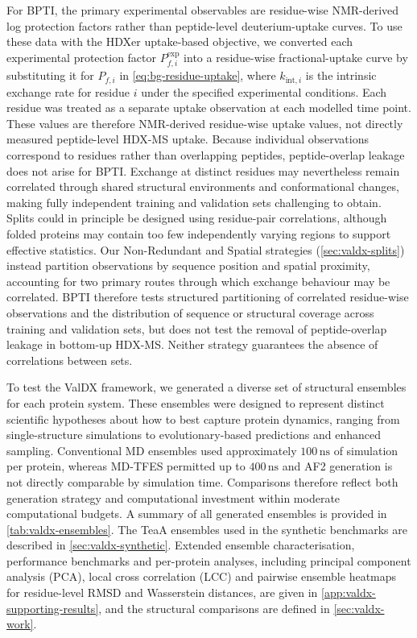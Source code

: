 For BPTI, the primary experimental observables are residue-wise NMR-derived log protection factors rather than peptide-level deuterium-uptake curves.\supercite{leeInterpretingHydrogenDeuteriumExchange2021} To use these data with the HDXer uptake-based objective, we converted each experimental protection factor $P_{f,i}^\text{exp}$ into a residue-wise fractional-uptake curve by substituting it for $P_{f,i}$ in \cref{eq:bg-residue-uptake}, where $k_{\text{int},i}$ is the intrinsic exchange rate for residue $i$ under the specified experimental conditions. Each residue was treated as a separate uptake observation at each modelled time point. These values are therefore NMR-derived residue-wise uptake values, not directly measured peptide-level HDX-MS uptake. Because individual observations correspond to residues rather than overlapping peptides, peptide-overlap leakage does not arise for BPTI. Exchange at distinct residues may nevertheless remain correlated through shared structural environments and conformational changes, making fully independent training and validation sets challenging to obtain. Splits could in principle be designed using residue-pair correlations, although folded proteins may contain too few independently varying regions to support effective statistics. Our Non-Redundant and Spatial strategies (\cref{sec:valdx-splits}) instead partition observations by sequence position and spatial proximity, accounting for two primary routes through which exchange behaviour may be correlated. BPTI therefore tests structured partitioning of correlated residue-wise observations and the distribution of sequence or structural coverage across training and validation sets, but does not test the removal of peptide-overlap leakage in bottom-up HDX-MS. Neither strategy guarantees the absence of correlations between sets.

To test the ValDX framework, we generated a diverse set of structural ensembles for each protein system. These ensembles were designed to represent distinct scientific hypotheses about how to best capture protein dynamics, ranging from single-structure simulations to evolutionary-based predictions and enhanced sampling. Conventional MD ensembles used approximately $100\,\text{ns}$ of simulation per protein, whereas MD-TFES permitted up to $400\,\text{ns}$ and AF2 generation is not directly comparable by simulation time. Comparisons therefore reflect both generation strategy and computational investment within moderate computational budgets. A summary of all generated ensembles is provided in \cref{tab:valdx-ensembles}. The TeaA ensembles used in the synthetic benchmarks are described in \cref{sec:valdx-synthetic}. Extended ensemble characterisation, performance benchmarks and per-protein analyses, including principal component analysis (PCA), local cross correlation (LCC) and pairwise ensemble heatmaps for residue-level RMSD and Wasserstein distances, are given in \cref{app:valdx-supporting-results}, and the structural comparisons are defined in \cref{sec:valdx-work}.

